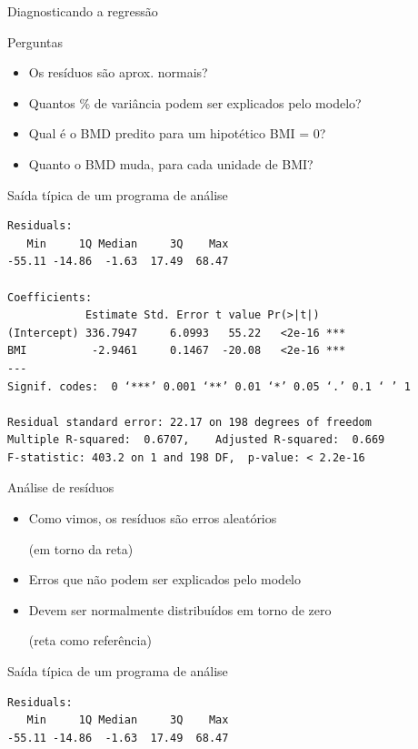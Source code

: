 \documentclass{beamer}
\begin{document}
\begin{frame}[fragile]{\scriptsize Diagnosticando a regressão}
  \begin{block}{Perguntas}
    \footnotesize
    \begin{itemize}
      \footnotesize
    \item Os resíduos são aprox. normais?
    \item Quantos \% de variância podem ser explicados pelo modelo?
    \item Qual é o BMD predito para um hipotético BMI = 0?
    \item Quanto o BMD muda, para cada unidade de BMI?
    \end{itemize}
  \end{block}
  \begin{exampleblock}{Saída típica de um programa de análise}
    \tiny
\begin{verbatim}
Residuals:
   Min     1Q Median     3Q    Max
-55.11 -14.86  -1.63  17.49  68.47

Coefficients:
            Estimate Std. Error t value Pr(>|t|)    
(Intercept) 336.7947     6.0993   55.22   <2e-16 ***
BMI          -2.9461     0.1467  -20.08   <2e-16 ***
---
Signif. codes:  0 ‘***’ 0.001 ‘**’ 0.01 ‘*’ 0.05 ‘.’ 0.1 ‘ ’ 1

Residual standard error: 22.17 on 198 degrees of freedom
Multiple R-squared:  0.6707,	Adjusted R-squared:  0.669
F-statistic: 403.2 on 1 and 198 DF,  p-value: < 2.2e-16
\end{verbatim}
\end{exampleblock}
\end{frame}

\begin{frame}[fragile]{\scriptsize Análise de resíduos}
  \begin{itemize}
  \item Como vimos, os resíduos são erros aleatórios

    ({\footnotesize em torno da reta})
    \bigskip
  \item {\small Erros que não podem ser explicados pelo modelo}
    \bigskip

  \item Devem ser normalmente distribuídos em torno de zero

    ({\footnotesize reta como referência})
  \end{itemize}
  \vfill
  \begin{exampleblock}{Saída típica de um programa de análise}
    \footnotesize
\begin{verbatim}
Residuals:
   Min     1Q Median     3Q    Max
-55.11 -14.86  -1.63  17.49  68.47
\end{verbatim}
  \end{exampleblock}
\end{frame}
\end{document}
